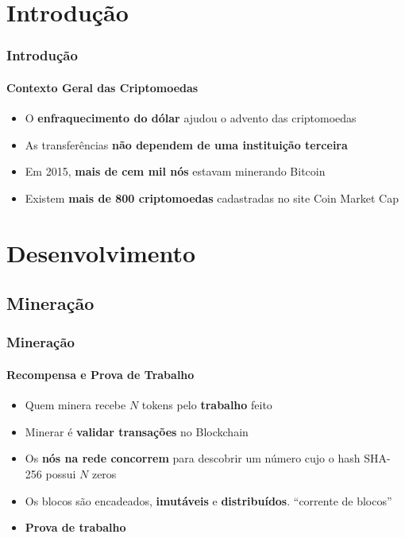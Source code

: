 \documentclass[aspectratio=43]{beamer}
\begin{document}
\section{Introdução}
\begin{frame}
\frametitle{Introdução}
\framesubtitle{Contexto Geral das Criptomoedas}

\begin{itemize}
    \item O \textbf{enfraquecimento do dólar} ajudou o advento das
        criptomoedas 

    \item As transferências \textbf{não dependem de uma instituição
        terceira}

    \item Em 2015, \textbf{mais de cem mil nós} estavam minerando
        Bitcoin 

    \item Existem \textbf{mais de 800 criptomoedas} cadastradas no site Coin
        Market Cap 

\end{itemize}

\end{frame}

\section[Desenvolvi\ldots]{Desenvolvimento}
\subsection{Mineração}

\begin{frame}
    \frametitle{Mineração}
    \framesubtitle{Recompensa e Prova de Trabalho}
    
    \begin{itemize}
        \item Quem minera recebe $N$ tokens pelo \textbf{trabalho} feito
            
        \item Minerar é \textbf{validar transações} no Blockchain

        \item Os \textbf{nós na rede concorrem} para descobrir um número cujo o
            hash SHA-256 possui $N$ zeros

        \item Os blocos são encadeados, \textbf{imutáveis} e
            \textbf{distribuídos}. ``corrente de blocos'' 

        \item \textbf{Prova de trabalho}
    \end{itemize}
\end{frame}
\end{document}
